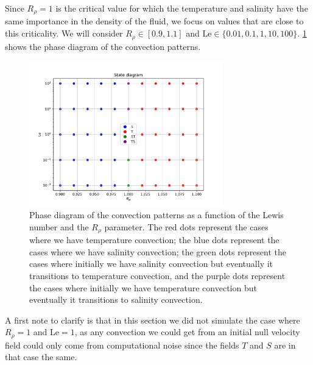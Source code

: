 \documentclass{article}
\def\Le{\mathrm{Le}}
\begin{document}
Since $R_\rho=1$ is the critical value for which the temperature and salinity have the same importance in the density of the fluid, we focus on values that are close to this criticality. We will consider $R_\rho \in [0.9,1.1]$ and $\Le\in \{0.01, 0.1, 1, 10, 100\}$. \cref{fig:phase_diagram} shows the phase diagram of the convection patterns.

\begin{figure}[ht]
  \centering
  \includegraphics[width=0.75\textwidth]{images/phase_diagram.pdf}
  \caption{Phase diagram of the convection patterns as a function of the Lewis number and the $R_{\rho}$ parameter. The red dots represent the cases where we have temperature convection; the blue dots represent the cases where we have salinity convection; the green dots represent the cases where initially we have salinity convection but eventually it transitions to temperature convection, and the purple dots represent the cases where initially we have temperature convection but eventually it transitions to salinity convection.}
  \label{fig:phase_diagram}
\end{figure}

A first note to clarify is that in this section we did not simulate the case where $R_\rho=1$ and $\Le=1$, as any convection we could get from an initial null velocity field could only come from computational noise since the fields $T$ and $S$ are in that case the same.
\end{document}
